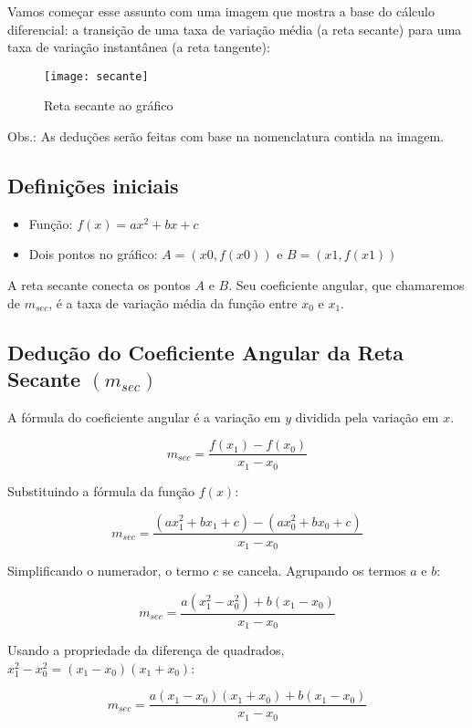 \documentclass[../resumo.tex]{subfiles}
\begin{document}
	Vamos começar esse assunto com uma imagem que mostra a base do cálculo diferencial:
	a transição de uma taxa de variação média (a reta secante) para uma taxa de variação instantânea (a reta tangente):

	\begin{figure}[H]
		\centering
		\texttt{[image: secante]}
		\caption{Reta secante ao gráfico}
		\label{fig:secante}

	\end{figure}

	Obs.: As deduções serão feitas com base na nomenclatura contida na imagem.

	\subsection{Definições iniciais}
	
	\begin{itemize}
		\item Função: $f(x) = ax^2 + bx + c$
		\item Dois pontos no gráfico: $A = (x0, f(x0))$ e $B = (x1, f(x1))$
	\end{itemize}

	A reta secante conecta os pontos $A$ e $B$. Seu coeficiente angular, que chamaremos de $m_{sec}$,
	é a taxa de variação média da função entre $x_0$ e $x_1$.

	\subsection{Dedução do Coeficiente Angular da Reta Secante $(m_{sec})$}

	A fórmula do coeficiente angular é a variação em $y$ dividida pela variação em $x$.

	\[ m_{sec} = \frac{f(x_1) - f(x_0)}{x_1 - x_0} \]

	Substituindo a fórmula da função $f(x)$:

	\[ m_{sec} = \frac{(ax_1^2 + bx_1 + c) - (ax_0^2 + bx_0 + c)}{x_1 - x_0} \]

	Simplificando o numerador, o termo $c$ se cancela. Agrupando os termos $a$ e $b$:

	\[ m_{sec} = \frac{a(x_1^2 - x_0^2) + b(x_1 - x_0)}{x_1 - x_0} \]

	Usando a propriedade da diferença de quadrados, $x_1^2 - x_0^2 = (x_1 - x_0)(x_1 + x_0)$:

	\[ m_{sec} = \frac{a(x_1 - x_0)(x_1 + x_0) + b(x_1 - x_0)}{x_1 - x_0} \]
\end{document}
